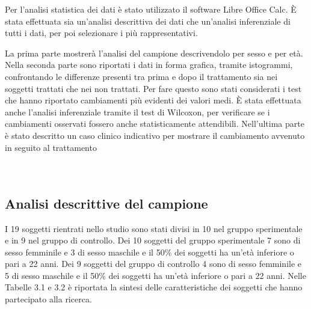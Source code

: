Per l’analisi statistica dei dati è stato utilizzato il software Libre Office Calc. È stata effettuata sia un’analisi descrittiva dei dati che un’analisi inferenziale di tutti i dati, per poi selezionare i più rappresentativi. 

La prima parte mostrerà l’analisi del campione descrivendolo per sesso e per età. Nella seconda parte sono riportati i dati in forma grafica, tramite istogrammi, confrontando le differenze presenti tra prima e dopo il trattamento sia nei soggetti trattati che nei non trattati. Per fare questo sono stati considerati i test che hanno riportato cambiamenti più evidenti dei valori medi. È stata effettuata anche l’analisi inferenziale tramite il test di Wilcoxon, per verificare se i cambiamenti osservati fossero anche statisticamente attendibili. Nell’ultima parte è stato descritto un caso clinico indicativo per mostrare il cambiamento avvenuto in seguito al
trattamento
\\\ \\\
\subsection{Analisi descrittive del campione}
I 19 soggetti rientrati nello studio sono stati divisi in 10 nel gruppo sperimentale e in 9 nel gruppo di controllo. Dei 10 soggetti del gruppo sperimentale 7 sono di sesso femminile e 3 di sesso maschile e il 50\% dei soggetti ha un’età inferiore o pari a 22 anni. Dei 9 soggetti del gruppo di controllo 4 sono di sesso femminile e 5 di sesso maschile e il 50\% dei soggetti ha un’età inferiore o pari a 22 anni. Nelle Tabelle 3.1 e 3.2 è riportata la sintesi delle caratteristiche dei soggetti che hanno partecipato alla ricerca.

